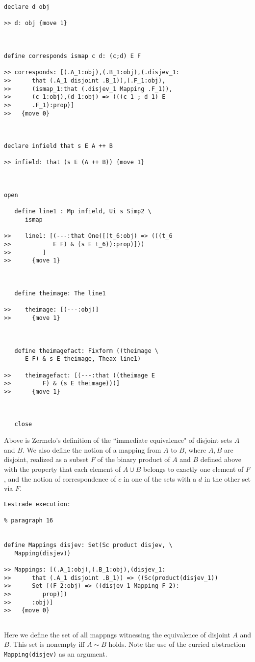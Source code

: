 \documentclass[12pt]{article}
\begin{document}
\begin{verbatim}
declare d obj

>> d: obj {move 1}



define corresponds ismap c d: (c;d) E F

>> corresponds: [(.A_1:obj),(.B_1:obj),(.disjev_1:
>>      that (.A_1 disjoint .B_1)),(.F_1:obj),
>>      (ismap_1:that (.disjev_1 Mapping .F_1)),
>>      (c_1:obj),(d_1:obj) => (((c_1 ; d_1) E
>>      .F_1):prop)]
>>   {move 0}



declare infield that s E A ++ B

>> infield: that (s E (A ++ B)) {move 1}



open

   define line1 : Mp infield, Ui s Simp2 \
      ismap

>>    line1: [(---:that One([(t_6:obj) => (((t_6
>>            E F) & (s E t_6)):prop)]))
>>         ]
>>      {move 1}



   define theimage: The line1

>>    theimage: [(---:obj)]
>>      {move 1}



   define theimagefact: Fixform ((theimage \
      E F) & s E theimage, Theax line1)

>>    theimagefact: [(---:that ((theimage E
>>         F) & (s E theimage)))]
>>      {move 1}



   close
\end{verbatim}

Above is Zermelo's definition of the ``immediate equivalence" of disjoint sets $A$ and $B$.  We also define the notion of a mapping from $A$ to $B$, where $A,B$ are disjoint, 
realized as a subset $F$ of the binary product of $A$ and $B$ defined above with the property that each element of $A \cup B$ belongs to exactly one element of $F$, and the notion of correspondence of $c$ in one of the sets with a $d$ in the other set via $F$.

\begin{verbatim}Lestrade execution:

% paragraph 16


define Mappings disjev: Set(Sc product disjev, \
   Mapping(disjev))

>> Mappings: [(.A_1:obj),(.B_1:obj),(disjev_1:
>>      that (.A_1 disjoint .B_1)) => ((Sc(product(disjev_1))
>>      Set [(F_2:obj) => ((disjev_1 Mapping F_2):
>>         prop)])
>>      :obj)]
>>   {move 0}


\end{verbatim}

Here we define the set of all mappngs witnessing the equivalence of disjoint $A$ and $B$.  This set is nonempty iff $A \sim B$ holds.  Note the use of the curried abstraction
{\tt Mapping(disjev)} as an argument.
\end{document}

